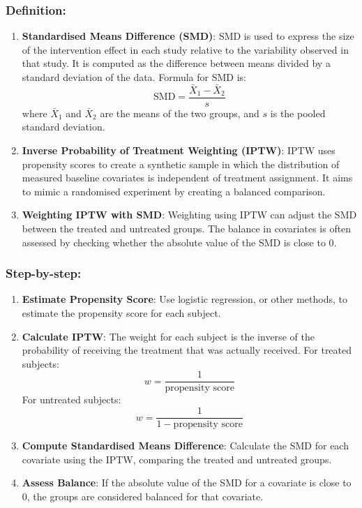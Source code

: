 \documentclass[
  singlecolumn]{article}
\begin{document}
\subsubsection{Definition:}\label{definition}

\begin{enumerate}
\def\labelenumi{\arabic{enumi}.}
\item
  \textbf{Standardised Means Difference (SMD)}: SMD is used to express
  the size of the intervention effect in each study relative to the
  variability observed in that study. It is computed as the difference
  between means divided by a standard deviation of the data. Formula for
  SMD is: \[
  \text{SMD} = \frac{{\bar{X}_1 - \bar{X}_2}}{{s}}
  \] where \(\bar{X}_1\) and \(\bar{X}_2\) are the means of the two
  groups, and \(s\) is the pooled standard deviation.
\item
  \textbf{Inverse Probability of Treatment Weighting (IPTW)}: IPTW uses
  propensity scores to create a synthetic sample in which the
  distribution of measured baseline covariates is independent of
  treatment assignment. It aims to mimic a randomised experiment by
  creating a balanced comparison.
\item
  \textbf{Weighting IPTW with SMD}: Weighting using IPTW can adjust the
  SMD between the treated and untreated groups. The balance in
  covariates is often assessed by checking whether the absolute value of
  the SMD is close to 0.
\end{enumerate}

\subsubsection{Step-by-step:}\label{step-by-step}

\begin{enumerate}
\def\labelenumi{\arabic{enumi}.}
\item
  \textbf{Estimate Propensity Score}: Use logistic regression, or other
  methods, to estimate the propensity score for each subject.
\item
  \textbf{Calculate IPTW}: The weight for each subject is the inverse of
  the probability of receiving the treatment that was actually received.
  For treated subjects: \[
  w = \frac{1}{{\text{propensity score}}}
  \] For untreated subjects: \[
  w = \frac{1}{{1 - \text{propensity score}}}
  \]
\item
  \textbf{Compute Standardised Means Difference}: Calculate the SMD for
  each covariate using the IPTW, comparing the treated and untreated
  groups.
\item
  \textbf{Assess Balance}: If the absolute value of the SMD for a
  covariate is close to 0, the groups are considered balanced for that
  covariate.
\end{enumerate}
\end{document}

